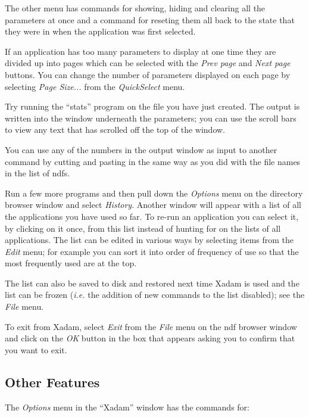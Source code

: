 \begin{list}{ 
}{\setlength{\rightmargin}{\leftmargin}}
The other menu has commands for showing, hiding and clearing all the
parameters at once and a command for reseting them all back to the
state that they were in when the application was first selected.

If an application has too many parameters to display at one time they
are divided up into pages which can be selected with the {\em Prev
page} and {\em Next page} buttons. You can change the number of
parameters displayed on each page by selecting {\em Page Size...} from
the {\em QuickSelect} menu.

\item Try running the ``stats'' program on the file you have just
created.  The output is written into the window underneath the
parameters; you can use the scroll bars to view any text that has
scrolled off the top of the window.

You can use any of the numbers in the output window as input to another
command by cutting and pasting in the same way as you did with the file
names in the list of ndfs.

\item Run a few more programs and then pull down the {\em Options} menu
on the directory browser window and select {\em History}. Another
window will appear with a list of all the applications you have used so
far. To re-run an application you can select it, by clicking on it
once, from this list instead of hunting for on the lists of all
applications. The list can be edited in various ways by selecting items
from the {\em Edit} menu; for example you can sort it into order of
frequency of use so that the most frequently used are at the top.

The list can also be saved to disk and restored next time Xadam is used
and the list can be frozen ({\em i.e.}\/ the addition of new commands to the
list disabled); see the {\em File} menu.

\end{list}

To exit from Xadam, select {\em Exit} from the {\em File} menu on the 
ndf browser window and click on the {\em OK} button in the box that appears
asking you to confirm that you want to exit.


\subsection{Other Features}

The {\em Options} menu in the ``Xadam'' window has the commands for:

